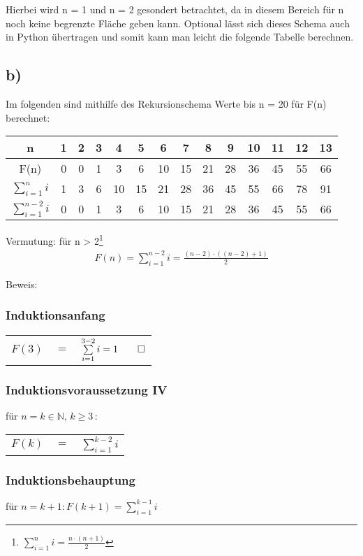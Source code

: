 \documentclass[titlepage]{article}
\begin{document}
		\noindent
		Hierbei wird n = 1 und n = 2 gesondert betrachtet, da in diesem Bereich für n noch keine begrenzte Fläche geben kann. Optional lässt sich dieses Schema auch in Python übertragen und somit kann man leicht die folgende Tabelle berechnen.
		
		\subsection*{b)}
		Im folgenden sind mithilfe des Rekursionschema Werte bis n = 20 für F(n) berechnet:
		\begin{table}[h]
			\begin{tabular}{c|ccccccccccccc}
				n&1&2&3&4&5&6&7&8&9&10&11&12&13\\\hline
				F(n)&0&0&1&3&6&10&15&21&28&36&45&55&66\\
				$\sum\limits_{i=1}^{n}i$&1&3&6&10&15&21&28&36&45&55&66&78&91\\
				$\sum\limits_{i=1}^{n-2}i$&0&0&1&3&6&10&15&21&28&36&45&55&66
			\end{tabular}
		\end{table}
	
		\noindent
		Vermutung: für n > 2\footnote{$\sum\limits_{i=1}^{n}i=\frac{n\cdot(n+1)}{2}$}
		\begin{align*}
			F(n)=\sum\limits_{i=1}^{n-2}i=\frac{(n-2)\cdot((n-2)+1)}{2}
		\end{align*}
		
		\noindent
		Beweis:
		\subsubsection*{Induktionsanfang}
		\begin{tabular}{lcc}
			$F(3)$& $=$ &$\sum\limits_{i=1}^{3-2}i=1\qed$
		\end{tabular}
	
		\subsubsection*{Induktionsvoraussetzung IV}
		für $n=k \in \mathbb{N},\,k \ge 3 \, :$
		\begin{tabular}{lcc}
			$F(k)$ & $=$ & $\sum\limits_{i=1}^{k-2}i$
		\end{tabular}
		\subsubsection*{Induktionsbehauptung}
		für $n=k+1 : F(k+1)=\sum\limits_{i=1}^{k-1}i$
\end{document}
